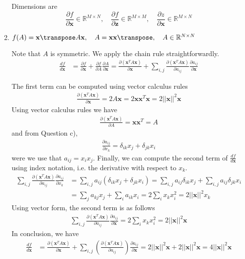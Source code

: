 \begin{enumerate}[label=\alph*.]
Dimensions are 
\[
\frac{\partial f}{\partial \textbf{x}} \in \mathbb{R}^{M\times N}, \quad \frac{\partial f}{\partial \textbf{z}}\in\mathbb{R}^{M\times M}, \quad \frac{\partial z}{\partial \textbf{x}}\in\mathbb{R}^{M\times N}
\]

\item $f(A) = \textbf{x}\transpose A \textbf{x}, \quad A=\textbf{x}\textbf{x}\transpose, \quad A\in\mathbb{R}^{N\times N}$

Note that $A$ is symmetric. We apply the chain rule straightforwardly.
\begin{align*}
\frac{d f}{d \textbf{x}} &= \frac{\partial f}{\partial \textbf{x}} + \frac{\partial f}{\partial A} \frac{\partial A}{\partial \textbf{x}} = \frac{\partial (\textbf{x}^T A \textbf{x}) }{\partial \textbf{x}} + \sum_{i,j}\frac{\partial (\textbf{x}^T A \textbf{x}) }{\partial a_{ij}} \frac{\partial a_{ij}}{\partial\textbf{x}}
\end{align*}

The first term can be computed using vector calculus rules
\begin{align*}
\frac{\partial (\textbf{x}^T A \textbf{x}) }{\partial \textbf{x}}  = 2A\textbf{x} = 2\textbf{x}\textbf{x}^T\textbf{x} = 2 ||\textbf{x}||^2\textbf{x}
\end{align*}
Using vector calculus rules we have
\begin{align*}
\frac{\partial (\textbf{x}^T A \textbf{x}) }{\partial A}  = \textbf{x}\textbf{x}^T = A
\end{align*}
and from Question  c),
\begin{align*}
\frac{\partial a_{ij}}{\partial x_k} = \delta_{ik}x_j + \delta_{jk}x_i
\end{align*}
were we use that $a_{ij} =x_ix_j$. Finally, we can compute the second term of $\frac{df}{d\textbf{x}}$ using index notation, i.e. the derivative with respect to $x_k$.
\begin{align*}
\sum_{i,j}\frac{\partial (\textbf{x}^T A \textbf{x}) }{\partial a_{ij}} \frac{\partial a_{ij}}{\partial x_k} &= \sum_{i,j} a_{ij}\left(\delta_{ik}x_j + \delta_{jk}x_i\right) = \sum_{i,j} a_{ij}\delta_{ik}x_j + \sum_{i,j} a_{ij}\delta_{jk}x_i\\
&= \sum_{j} a_{kj}x_j + \sum_{i} a_{ik}x_i = 2 \sum_{i} x_k x_i^2 = 2 ||\textbf{x}||^2x_k
\end{align*}
Using vector form, the second term is as follows
\begin{align*}
\sum_{i,j}\frac{\partial (\textbf{x}^T A \textbf{x}) }{\partial a_{ij}} \frac{\partial a_{ij}}{\partial\textbf{x}} = 2 \sum_{i} x_k x_i^2 = 2 ||\textbf{x}||^2\textbf{x}
\end{align*}
In conclusion, we have
\begin{align*}
\frac{d f}{d \textbf{x}} &= \frac{\partial (\textbf{x}^T A \textbf{x}) }{\partial \textbf{x}} + \sum_{i,j}\left(\frac{\partial (\textbf{x}^T A \textbf{x}) }{\partial a_{ij}}\right) \frac{\partial a_{ij}}{\partial\textbf{x}} = 2 ||\textbf{x}||^2\textbf{x}+ 2 ||\textbf{x}||^2\textbf{x} = 4 ||\textbf{x}||^2\textbf{x}
\end{align*}


\end{enumerate}
